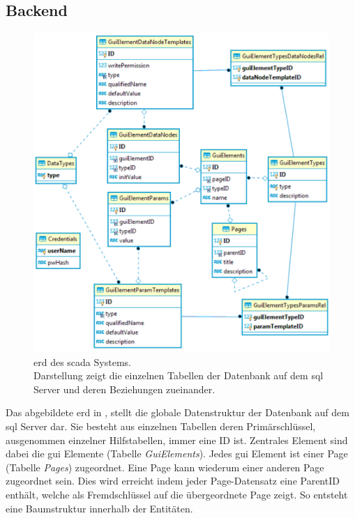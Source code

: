 \subsection{Backend}\label{subsec:dataBackend}
\begin{figure}[ht]
  \centering
  \includegraphics[width=\textwidth]{content/hauptteil/systemEntwurf/res/erd.pdf}
  \caption[\acs{erd} des \acs{scada} Systems]{\acs{erd} des \ac{scada} Systems.\\
    Darstellung zeigt die einzelnen Tabellen der Datenbank auf dem \ac{sql} Server und deren Beziehungen zueinander.}
  \label{img:erd}
\end{figure}
Das abgebildete \ac{erd} in , stellt die globale Datenstruktur der Datenbank auf dem \ac{sql} Server dar.
Sie besteht aus einzelnen Tabellen deren Primärschlüssel, ausgenommen einzelner Hilfstabellen, immer eine ID ist.
Zentrales Element sind dabei die \ac{gui} Elemente (Tabelle \emph{GuiElements}). Jedes \ac{gui} Element ist einer Page (Tabelle \emph{Pages}) zugeordnet. 
Eine Page kann wiederum einer anderen Page zugeordnet sein. 
Dies wird erreicht indem jeder Page-Datensatz eine ParentID enthält, welche als Fremdschlüssel auf die übergeordnete Page zeigt. So entsteht eine Baumstruktur innerhalb der Entitäten.
